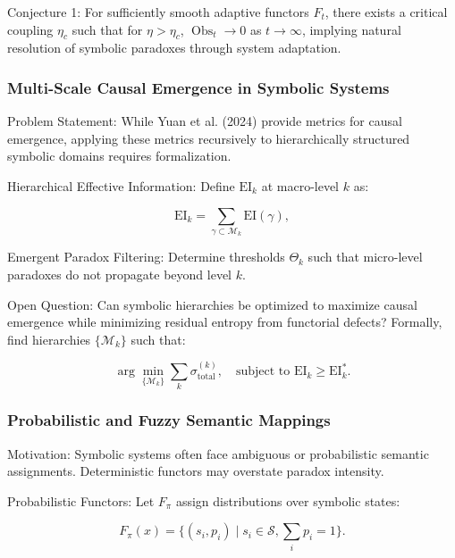 \documentclass[12pt]{article}
\theoremstyle{plain}
\begin{document}
Conjecture 1: For sufficiently smooth adaptive functors \(F_t\), there exists a critical coupling \(\eta_c\) such that for \(\eta > \eta_c\), \(\operatorname{Obs}_t \to 0\) as \(t \to \infty\), implying natural resolution of symbolic paradoxes through system adaptation.

\subsubsection{Multi-Scale Causal Emergence in Symbolic Systems}

Problem Statement: While Yuan et al. (2024) provide metrics for causal emergence, applying these metrics recursively to hierarchically structured symbolic domains requires formalization.

Hierarchical Effective Information: Define \(\text{EI}_k\) at macro-level \(k\) as:

\begin{equation}
\text{EI}_k = \sum_{\gamma \subset \mathcal{M}_k} \text{EI}(\gamma),
\end{equation}

Emergent Paradox Filtering: Determine thresholds \(\Theta_k\) such that micro-level paradoxes do not propagate beyond level \(k\).

Open Question: Can symbolic hierarchies be optimized to maximize causal emergence while minimizing residual entropy from functorial defects? Formally, find hierarchies \(\{\mathcal{M}_k\}\) such that:

\begin{equation}
\arg\min_{\{\mathcal{M}_k\}} \sum_k \sigma_{\mathrm{total}}^{(k)}, \quad \text{subject to } \text{EI}_k \geq \text{EI}_k^\ast.
\end{equation}

\subsubsection{Probabilistic and Fuzzy Semantic Mappings}

Motivation: Symbolic systems often face ambiguous or probabilistic semantic assignments. Deterministic functors may overstate paradox intensity.

Probabilistic Functors: Let \(F_\pi\) assign distributions over symbolic states:

\begin{equation}
F_\pi(x) = \{ (s_i, p_i) \mid s_i \in \mathcal{S}, \sum_i p_i = 1 \}.
\end{equation}
\end{document}
